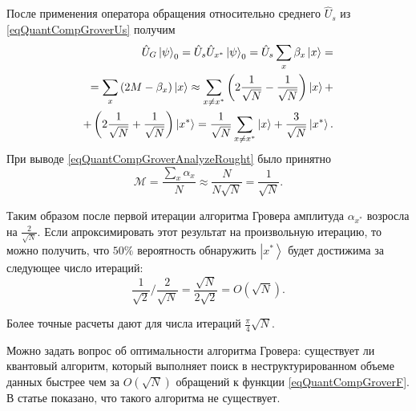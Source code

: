 После применения оператора обращения относительно среднего $\hat{U}_s$ 
из \eqref{eqQuantCompGroverUs} получим
\begin{eqnarray}
\hat{U}_G \left|\psi\right>_0 = 
\hat{U}_s \hat{U}_{x^{\ast}} \left|\psi\right>_0 = 
\hat{U}_s \sum_x \beta_x \ket{x} = 
\nonumber \\
= \sum_x \left(2 M - \beta_x\right) \ket{x} \approx 
\sum_{x\ne x^{\ast}} \left( 2 \frac{1}{\sqrt{N}} - \frac{1}{\sqrt{N}}
\right) \ket{x} + 
\nonumber \\
+ \left( 2 \frac{1}{\sqrt{N}} +
\frac{1}{\sqrt{N}} \right) \left|x^{\ast}\right> = 
\frac{1}{\sqrt{N}}\sum_{x\ne x^{\ast}} \ket{x} + 
\frac{3}{\sqrt{N}} \left|x^{\ast}\right>.
\label{eqQuantCompGroverAnalyzeRought}
\end{eqnarray}
При выводе \eqref{eqQuantCompGroverAnalyzeRought} было принятно 
\[
\mathcal{M} = \frac{\sum_x \alpha_x}{N} \approx
\frac{N}{N \sqrt{N}} = \frac{1}{\sqrt{N}}.
\]

Таким образом после первой итерации алгоритма Гровера амплитуда
$\alpha_{x^{\ast}}$ возросла на $\frac{2}{\sqrt{N}}$. Если
апроксимировать этот результат на произвольную итерацию, то можно
получить, что $50\%$ вероятность обнаружить $\left|x^{\ast}\right>$
будет достижима за следующее число итераций:
\[
\frac{1}{\sqrt{2}}/\frac{2}{\sqrt{N}} =
\frac{\sqrt{N}}{2 \sqrt{2}} = O\left(\sqrt{N}\right).
\]

Более точные расчеты \cite{nielsen2000quantum} дают для числа итераций
$\frac{\pi}{4}\sqrt{N}$. 

Можно задать вопрос об оптимальности алгоритма Гровера: существует ли
квантовый алгоритм, который выполняет поиск в неструктурированном
объеме данных быстрее чем за $O\left(\sqrt{N}\right)$ обращений к
функции \eqref{eqQuantCompGroverF}. В статье
\cite{bBennettGroverOptimal} показано, что такого алгоритма
не существует.
